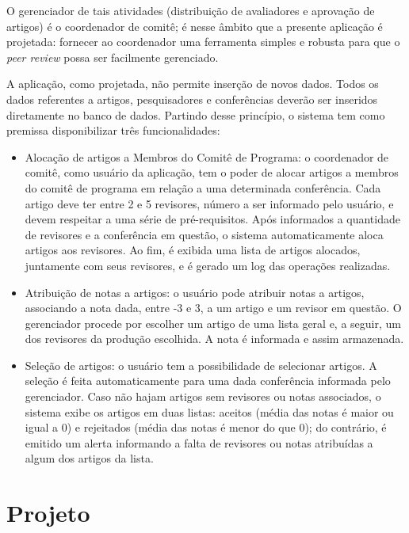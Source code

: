 \documentclass[a4paper, 12pt]{article}
\begin{document}
O gerenciador de tais atividades (distribuição de avaliadores e aprovação de artigos) é o coordenador de comitê; é nesse âmbito que a presente aplicação é projetada: fornecer ao coordenador uma ferramenta simples e robusta para que o \emph{peer review} possa ser facilmente gerenciado.

A aplicação, como projetada, não permite inserção de novos dados. Todos os dados referentes a artigos, pesquisadores e conferências deverão ser inseridos diretamente no banco de dados. Partindo desse princípio, o sistema tem como premissa disponibilizar três funcionalidades:

\begin{itemize}
\item {Alocação de artigos a Membros do Comitê de Programa}: o coordenador de comitê, como usuário da aplicação, tem o poder de alocar artigos a membros do comitê de programa em relação a uma determinada conferência. Cada artigo deve ter entre 2 e 5 revisores, número a ser informado pelo usuário, e devem respeitar a uma série de pré-requisitos. Após informados a quantidade de revisores e a conferência em questão, o sistema automaticamente aloca artigos aos revisores. Ao fim, é exibida uma lista de artigos alocados, juntamente com seus revisores, e é gerado um log das operações realizadas.

\item {Atribuição de notas a artigos}: o usuário pode atribuir notas a artigos, associando a nota dada, entre -3 e 3, a um artigo e um revisor em questão. O gerenciador procede por escolher um artigo de uma lista geral e, a seguir, um dos revisores da produção escolhida. A nota é informada e assim armazenada.

\item {Seleção de artigos}: o usuário tem a possibilidade de selecionar artigos. A seleção é feita automaticamente para uma dada conferência informada pelo gerenciador. Caso não hajam artigos sem revisores ou notas associados, o sistema exibe os artigos em duas listas: aceitos (média das notas é maior ou igual a 0) e rejeitados (média das notas é menor do que 0); do contrário, é emitido um alerta informando a falta de revisores ou notas atribuídas a algum dos artigos da lista.
\end{itemize}


\section{Projeto}
\end{document}
